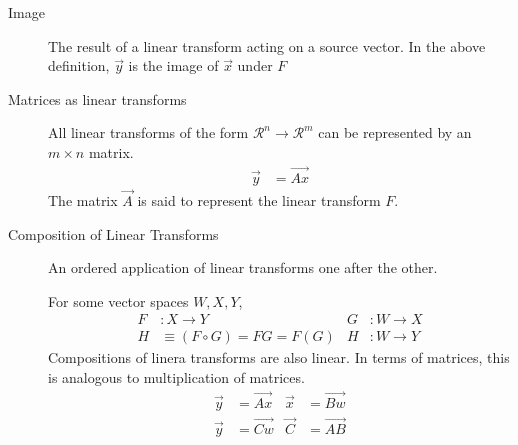 \begin{description}
    \item[Image] The result of a linear transform acting on a source vector.
        In the above definition, $ \vec{y} $ is the image of $ \vec{x} $
        under $ F $

    \item[Matrices as linear transforms] All linear transforms of the form
        $ \mathcal{R}^n \to \mathcal{R}^m $ can be represented by an
        $ m \times n $ matrix.
        \begin{align}
            \vec{y} & = \vec{Ax}
        \end{align}
        The matrix $ \vec{A} $ is said to represent the linear transform $ F $.

    \item[Composition of Linear Transforms] An ordered application of linear transforms
        one after the other. \par
        For some vector spaces $ W, X, Y $,
        \begin{align}
            F & : X \to Y                      & G & : W \to X \\
            H & \equiv (F \circ G) = FG = F(G) & H & : W \to Y
        \end{align}
        Compositions of linera transforms are also linear. In terms of matrices, this
        is analogous to multiplication of matrices.
        \begin{align}
            \vec{y} & = \vec{Ax} & \vec{x} & = \vec{Bw} \\
            \vec{y} & = \vec{Cw} & \vec{C} & = \vec{AB}
        \end{align}

\end{description}